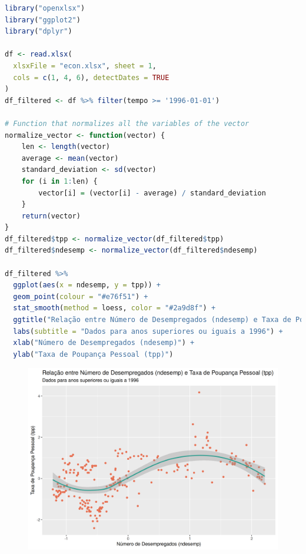 \documentclass[12pt,a4paper]{article}
\begin{document}
\begin{lstlisting}[language=R]
library("openxlsx")
library("ggplot2")
library("dplyr")

df <- read.xlsx(
  xlsxFile = "econ.xlsx", sheet = 1,
  cols = c(1, 4, 6), detectDates = TRUE
)
df_filtered <- df %>% filter(tempo >= '1996-01-01')

# Function that normalizes all the variables of the vector
normalize_vector <- function(vector) {
    len <- length(vector)
    average <- mean(vector)
    standard_deviation <- sd(vector)
    for (i in 1:len) {
        vector[i] = (vector[i] - average) / standard_deviation
    }
    return(vector)
}
df_filtered$tpp <- normalize_vector(df_filtered$tpp)
df_filtered$ndesemp <- normalize_vector(df_filtered$ndesemp)

df_filtered %>%
  ggplot(aes(x = ndesemp, y = tpp)) +
  geom_point(colour = "#e76f51") +
  stat_smooth(method = loess, color = "#2a9d8f") +
  ggtitle("Relação entre Número de Desempregados (ndesemp) e Taxa de Poupança Pessoal (tpp)") +
  labs(subtitle = "Dados para anos superiores ou iguais a 1996") +
  xlab("Número de Desempregados (ndesemp)") +
  ylab("Taxa de Poupança Pessoal (tpp)")
\end{lstlisting}

\qquad

\begin{figure}[h]
  \centering
  \includegraphics[scale = 0.8]{./ex01.png}
\end{figure}
\end{document}
